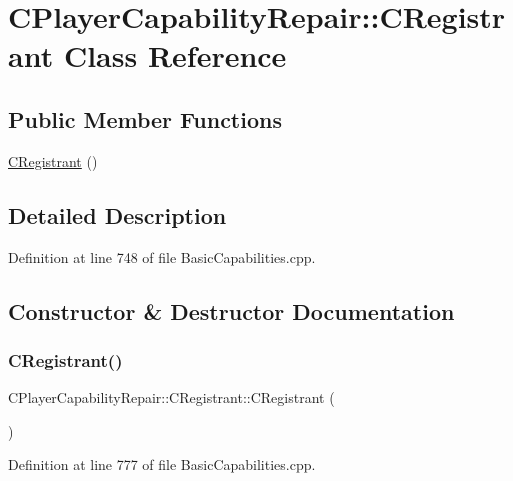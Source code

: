 \hypertarget{classCPlayerCapabilityRepair_1_1CRegistrant}{}\section{C\+Player\+Capability\+Repair\+:\+:C\+Registrant Class Reference}
\label{classCPlayerCapabilityRepair_1_1CRegistrant}
\subsection*{Public Member Functions}
\begin{DoxyCompactItemize}
\item 
\hyperlink{classCPlayerCapabilityRepair_1_1CRegistrant_aeffe332a2dd871a9c29f6d1fa780f473}{C\+Registrant} ()
\end{DoxyCompactItemize}


\subsection{Detailed Description}


Definition at line 748 of file Basic\+Capabilities.\+cpp.



\subsection{Constructor \& Destructor Documentation}
\hypertarget{classCPlayerCapabilityRepair_1_1CRegistrant_aeffe332a2dd871a9c29f6d1fa780f473}{}\label{classCPlayerCapabilityRepair_1_1CRegistrant_aeffe332a2dd871a9c29f6d1fa780f473} 
\subsubsection{\texorpdfstring{C\+Registrant()}{CRegistrant()}}
{\footnotesize\ttfamily C\+Player\+Capability\+Repair\+::\+C\+Registrant\+::\+C\+Registrant (\begin{DoxyParamCaption}{ }\end{DoxyParamCaption})}



Definition at line 777 of file Basic\+Capabilities.\+cpp.


